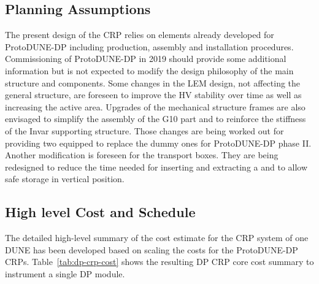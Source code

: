 \subsection{Planning Assumptions}
\label{ch:dp-crp-planning}
The present design of the CRP relies on elements already developed for ProtoDUNE-DP including production, assembly and installation procedures. 
Commissioning of ProtoDUNE-DP in \num{2019} should provide some additional information but is not expected to modify the design philosophy of the main structure and components.  Some changes in the LEM design, not affecting the general structure, are foreseen to improve the HV stability over time as well as increasing the active area.  Upgrades of the mechanical structure frames are also envisaged to simplify the assembly of the G10 part and to reinforce the stiffness of the Invar supporting structure. Those changes are being worked out for providing two equipped  to replace the dummy ones for ProtoDUNE-DP phase II.
Another modification is foreseen for the transport boxes. They are being redesigned to reduce the time needed for inserting and extracting a  and to allow safe storage in vertical position.

\subsection{High level Cost and Schedule}
\label{ch:dp-crp-costschedrisk}
The detailed high-level summary of the cost estimate for the CRP system of one DUNE \dpmod  has been developed based on scaling the costs for the ProtoDUNE-DP CRPs. 
Table~\ref{tab:dp-crp-cost} shows the resulting DP CRP core cost summary  to instrument a single DP module.


